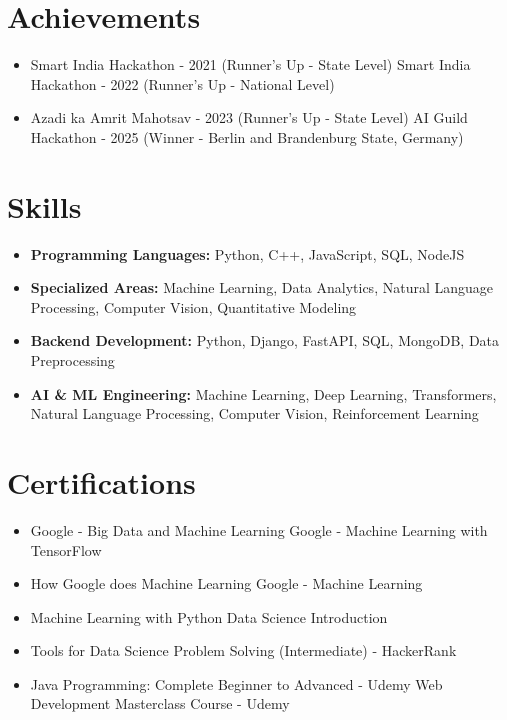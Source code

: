 \documentclass[a4paper,10pt]{article}
\begin{document}
\section*{Achievements}
\begin{itemize}
\item Smart India Hackathon - 2021 (Runner's Up - State Level) \hfill Smart India Hackathon - 2022 (Runner's Up - National Level)
\item Azadi ka Amrit Mahotsav - 2023 (Runner's Up - State Level) \hfill AI Guild Hackathon - 2025 (Winner - Berlin and Brandenburg State, Germany)
\end{itemize}

\section*{Skills}
\begin{itemize}
  \item \textbf{Programming Languages:} Python, C++, JavaScript, SQL, NodeJS
  \item \textbf{Specialized Areas:} Machine Learning, Data Analytics, Natural Language Processing, Computer Vision, Quantitative Modeling
  \item \textbf{Backend Development:} Python, Django, FastAPI, SQL, MongoDB, Data Preprocessing
  \item \textbf{AI \& ML Engineering:} Machine Learning, Deep Learning, Transformers, Natural Language Processing, Computer Vision, Reinforcement Learning
\end{itemize}

\section*{Certifications}
\begin{itemize}
\item Google - Big Data and Machine Learning \hfill Google - Machine Learning with TensorFlow
\item How Google does Machine Learning \hfill Google - Machine Learning
\item Machine Learning with Python \hfill Data Science Introduction
\item Tools for Data Science \hfill Problem Solving (Intermediate) - HackerRank
\item Java Programming: Complete Beginner to Advanced - Udemy \hfill Web Development Masterclass Course - Udemy
\end{itemize}
\end{document}
